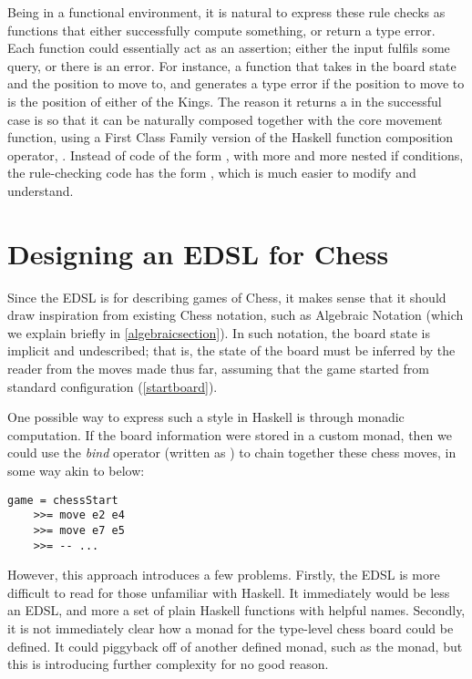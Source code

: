 Being in a functional environment, it is natural to express these rule checks as functions that either successfully compute something, or return a type error. Each function could essentially act as an assertion; either the input fulfils some query, or there is an error. For instance, a function  that takes in the board state and the position to move to, and generates a type error if the position to move to is the position of either of the Kings. The reason it returns a  in the successful case is so that it can be naturally composed together with the core movement function, using a First Class Family version of the Haskell function composition operator, . Instead of code of the form , with more and more nested if conditions, the rule-checking code has the form , which is much easier to modify and understand.

\section{Designing an EDSL for Chess}

Since the EDSL is for describing games of Chess, it makes sense that it should draw inspiration from existing Chess notation, such as Algebraic Notation (which we explain briefly in \cref{algebraicsection}). In such notation, the board state is implicit and undescribed; that is, the state of the board must be inferred by the reader from the moves made thus far, assuming that the game started from standard configuration (\cref{startboard}).

One possible way to express such a style in Haskell is through monadic computation. If the board information were stored in a custom monad, then we could use the \emph{bind} operator (written as \inline{>>=)}) to chain together these chess moves, in some way akin to below:

\begin{lstlisting}
game = chessStart
    >>= move e2 e4
    >>= move e7 e5
    >>= -- ...
\end{lstlisting}

However, this approach introduces a few problems. Firstly, the EDSL is more difficult to read for those unfamiliar with Haskell. It immediately would be less an EDSL, and more a set of plain Haskell functions with helpful names. Secondly, it is not immediately clear how a monad for the type-level chess board could be defined. It could piggyback off of another defined monad, such as the  monad, but this is introducing further complexity for no good reason.


